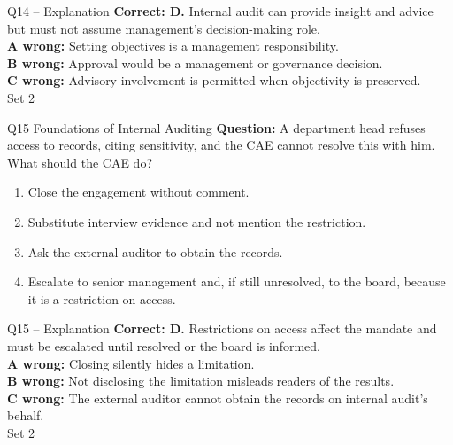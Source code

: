 \documentclass[aspectratio=169,10pt]{beamer}
\begin{document}
\begin{frame}[t]{Q14 -- Explanation}
	\footnotesize
	\textbf{Correct: D.} Internal audit can provide insight and advice but must not assume management's decision-making role. \\[5pt]
\textbf{A wrong:} Setting objectives is a management responsibility. \\[3pt]
\textbf{B wrong:} Approval would be a management or governance decision. \\[3pt]
\textbf{C wrong:} Advisory involvement is permitted when objectivity is preserved. \\[3pt]
	\vfill {\tiny Set 2}
\end{frame}

\begin{frame}[t]{Q15 \hfill {\scriptsize Foundations of Internal Auditing}}
	\small
	\textbf{Question:} A department head refuses access to records, citing sensitivity, and the CAE cannot resolve this with him. What should the CAE do?
	\begin{enumerate}[label=\Alph*.,itemsep=1pt,topsep=3pt]
			\item Close the engagement without comment.
			\item Substitute interview evidence and not mention the restriction.
			\item Ask the external auditor to obtain the records.
			\item Escalate to senior management and, if still unresolved, to the board, because it is a restriction on access.
	\end{enumerate}
\end{frame}

\begin{frame}[t]{Q15 -- Explanation}
	\footnotesize
	\textbf{Correct: D.} Restrictions on access affect the mandate and must be escalated until resolved or the board is informed. \\[5pt]
\textbf{A wrong:} Closing silently hides a limitation. \\[3pt]
\textbf{B wrong:} Not disclosing the limitation misleads readers of the results. \\[3pt]
\textbf{C wrong:} The external auditor cannot obtain the records on internal audit's behalf. \\[3pt]
	\vfill {\tiny Set 2}
\end{frame}
\end{document}
